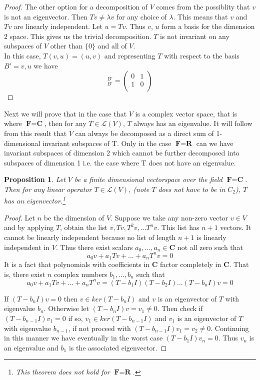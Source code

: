 \documentclass{article}
\theoremstyle{problemstyle}
\newtheorem{proposition}{Proposition}
\begin{document}
\begin{proof}
The other option for a decomposition of $V$ comes from the possiblity that $v$ is not an eigenvector. Then $Tv \neq \lambda v$ for any choice of $\lambda$. This means that $v$ and $Tv$ are linearly independent. Let $u = Tv$. Thus $v$, $u$ form a basis for the dimension $2$ space. This gives us the trivial decomposition. $T$ is not invariant on any subspaces of $V$ other than $\{0\}$ and all of $V$.\\ 

In this case, $T(v,u) = (u,v)$ and representing $T$ with respect to the basis $B' = v,u$ we have
\begin{equation}
[T]_{B'}^{B'} = 
\begin{pmatrix} 0 & 1 \\
 1 & 0  \\
\end{pmatrix}
\end{equation}

\end{proof}

Next we will prove that in the case that $V$ is a complex vector space, that is where $\textbf{F} = \textbf{C}$, then for any $T \in \mathscr{L}(V)$, $T$ always has an eigenvalue. It will follow from this result that $V$ can always be decomposed as a direct sum of 1-dimensional invariant subspaces of T. Only in the case $\textbf{F} = \textbf{R}$ can we have invariant subspaces of dimension 2 which cannot be further decomposed into subspaces of dimension 1 i.e. the case where T does not have an eigenvalue.  


\begin{proposition}
Let $V$ be a finite dimensional vectorspace over the field $\textbf{F} = \textbf{C}$. Then for any linear operator $T \in \mathscr{L}(V)$, (note $T$ does not have to be in $C_2$), $T$ has an eigenvector.\footnote{This theorem does not hold for $\textbf{F} = \textbf{R}$.} 
\end{proposition}

\begin{proof}
Let $n$ be the dimension of $V$. Suppose we take any non-zero vector $v \in V$ and by applying $T$, obtain the list $v, Tv, T^2v, ... T^nv$. This list has $n+1$ vectors. It cannot be linearly independent because no list of length $n+1$ is linearly independent in $V$. Thus there exist scalars $a_0,...,a_n \in \textbf{C}$ not all zero such that $$a_0v + a_1Tv +...+a_nT^nv = 0$$ It is a fact that polynomials with coefficients in $\textbf{C}$ factor completely in $\textbf{C}$. That is, there exist $n$ complex numbers $b_1, ... ,b_n$ such that   $$a_0v + a_1Tv +...+a_nT^nv = (T- b_1I)(T-b_2I)...(T-b_nI)v=0$$

If $(T-b_nI)v=0$ then $v \in ker(T-b_nI)$ and $v$ is an eigenvector of $T$ with eigenvalue $b_n$. Otherwise let $(T-b_nI)v=v_1 \neq 0$. Then check if $(T-b_{n-1}I)v_1 = 0$ if so, $v_1 \in ker(T-b_{n-1}I)$ and $v_1$ is an eigenvector of $T$ with eigenvalue $b_{n-1}$, if not proceed with $(T-b_{n-1}I)v_1 = v_2 \neq 0$. Continuing in this manner we have eventually in the worst case $(T- b_1I)v_n = 0$. Thus $v_n$ is an eigenvalue and $b_1$ is the associated eigenvector. 
\end{proof}
\end{document}
